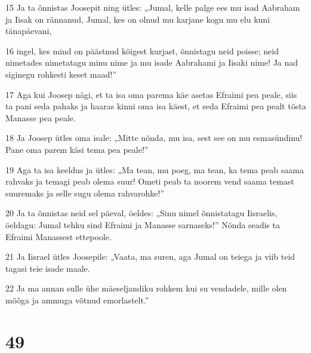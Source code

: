 \par 15 Ja ta õnnistas Joosepit ning ütles: „Jumal, kelle palge ees mu isad Aabraham ja Iisak on rännanud, Jumal, kes on olnud mu karjane kogu mu elu kuni tänapäevani,
\par 16 ingel, kes mind on päästnud kõigest kurjast, õnnistagu neid poisse; neid nimetades nimetatagu minu nime ja mu isade Aabrahami ja Iisaki nime! Ja nad siginegu rohkesti keset maad!”
\par 17 Aga kui Joosep nägi, et ta isa oma parema käe asetas Efraimi pea peale, siis ta pani seda pahaks ja haaras kinni oma isa käest, et seda Efraimi pea pealt tõsta Manasse pea peale.
\par 18 Ja Joosep ütles oma isale: „Mitte nõnda, mu isa, sest see on mu esmasündinu! Pane oma parem käsi tema pea peale!”
\par 19 Aga ta isa keeldus ja ütles: „Ma tean, mu poeg, ma tean, ka tema peab saama rahvaks ja temagi peab olema suur! Ometi peab ta noorem vend saama temast suuremaks ja selle sugu olema rahvarohke!”
\par 20 Ja ta õnnistas neid sel päeval, öeldes: „Sinu nimel õnnistatagu Iisraelis, öeldagu: Jumal tehku sind Efraimi ja Manasse sarnaseks!” Nõnda seadis ta Efraimi Manassest ettepoole.
\par 21 Ja Iisrael ütles Joosepile: „Vaata, ma suren, aga Jumal on teiega ja viib teid tagasi teie isade maale.
\par 22 Ja ma annan sulle ühe mäeseljandiku rohkem kui su vendadele, mille olen mõõga ja ammuga võtnud emorlastelt.”

\chapter{49}

